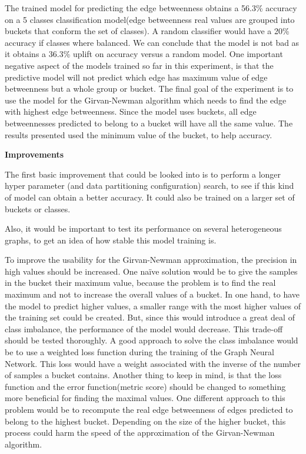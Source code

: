 The trained model for predicting the edge betweenness obtains a 56.3\% accuracy on a 5 classes classification model(edge betweenness real values are grouped into buckets that conform the set of classes). A random classifier would have a 20\% accuracy if classes where balanced. We can conclude that the model is not bad as it obtains a 36.3\% uplift on accuracy versus a random model.
One important negative aspect of the models trained so far in this experiment, is that the predictive model will not predict which edge has maximum value of edge betweenness but a whole group or bucket. The final goal of the experiment is to use the model for the Girvan-Newman algorithm which needs to find the edge with highest edge betweenness. Since the model uses buckets, all edge betweennesses predicted to belong to a bucket will have all the same value. The results presented used the minimum value of the bucket, to help accuracy.

\textbf{Improvements}

The first basic improvement that could be looked into is to perform a longer hyper parameter (and data partitioning configuration) search, to see if this kind of model can obtain a better accuracy. It could also be trained on a larger set of buckets or classes. 


Also, it would be important to test its performance on several heterogeneous graphs, to get an idea of how stable this model training is.


To improve the usability for the Girvan-Newman approximation, the precision in high values should be increased. One naïve solution would be to give the samples in the bucket their maximum value, because the problem is to find the real maximum and not to increase the overall values of a bucket. In one hand, to have the model to predict higher values, a smaller range with the most higher values of the training set could be created. But, since this would introduce a great deal of class imbalance, the performance of the model would decrease. This trade-off should be tested thoroughly. A good approach to solve the class imbalance would be to use a weighted loss function during the training of the Graph Neural Network. This loss would have a weight associated with the inverse of the number of samples a bucket contains. Another thing to keep in mind, is that the loss function and the error function(metric score) should be changed to something more beneficial for finding the maximal values. One different approach to this problem would be to recompute the real edge betweenness of edges predicted to belong to the highest bucket. Depending on the size of the higher bucket, this process could harm the speed of the approximation of the Girvan-Newman algorithm.


